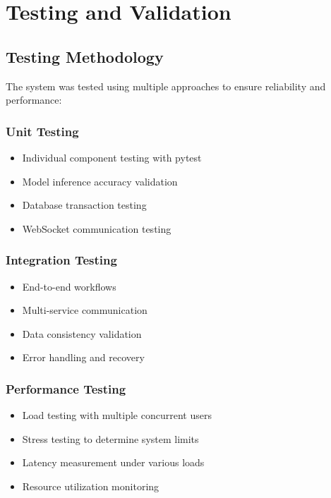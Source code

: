 \section{Testing and Validation}

\subsection{Testing Methodology}

The system was tested using multiple approaches to ensure reliability and performance:

\subsubsection{Unit Testing}
\begin{itemize}
    \item Individual component testing with pytest
    \item Model inference accuracy validation
    \item Database transaction testing
    \item WebSocket communication testing
\end{itemize}

\subsubsection{Integration Testing}
\begin{itemize}
    \item End-to-end workflows
    \item Multi-service communication
    \item Data consistency validation
    \item Error handling and recovery
\end{itemize}

\subsubsection{Performance Testing}
\begin{itemize}
    \item Load testing with multiple concurrent users
    \item Stress testing to determine system limits
    \item Latency measurement under various loads
    \item Resource utilization monitoring
\end{itemize}

